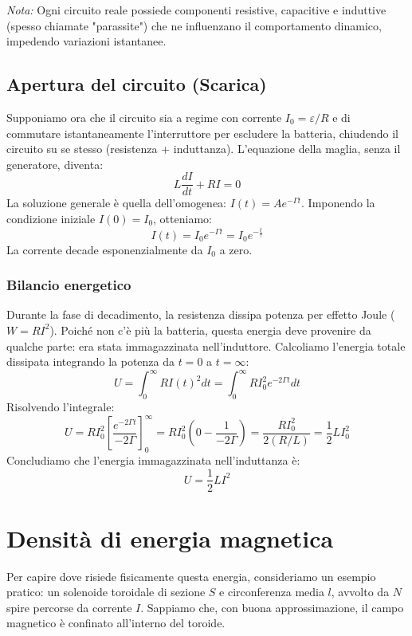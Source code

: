 \documentclass{book}
\begin{document}
\textit{Nota:} Ogni circuito reale possiede componenti resistive, capacitive e induttive (spesso chiamate "parassite") che ne influenzano il comportamento dinamico, impedendo variazioni istantanee.

\subsection{Apertura del circuito (Scarica)}
Supponiamo ora che il circuito sia a regime con corrente $I_0 = \varepsilon/R$ e di commutare istantaneamente l'interruttore per escludere la batteria, chiudendo il circuito su se stesso (resistenza + induttanza).
L'equazione della maglia, senza il generatore, diventa:
$$
L \frac{dI}{dt} + R I = 0
$$
La soluzione generale è quella dell'omogenea: $I(t) = A e^{-\Gamma t}$.
Imponendo la condizione iniziale $I(0) = I_0$, otteniamo:
$$
I(t) = I_0 e^{-\Gamma t} = I_0 e^{-\frac{t}{\tau}}
$$
La corrente decade esponenzialmente da $I_0$ a zero.

\subsubsection{Bilancio energetico}
Durante la fase di decadimento, la resistenza dissipa potenza per effetto Joule ($W = RI^2$). Poiché non c'è più la batteria, questa energia deve provenire da qualche parte: era stata immagazzinata nell'induttore.
Calcoliamo l'energia totale dissipata integrando la potenza da $t=0$ a $t=\infty$:
$$
U = \int_0^{\infty} R I(t)^2 dt = \int_0^{\infty} R I_0^2 e^{-2\Gamma t} dt
$$
Risolvendo l'integrale:
$$
U = R I_0^2 \left[ \frac{e^{-2\Gamma t}}{-2\Gamma} \right]_0^{\infty} = R I_0^2 \left( 0 - \frac{1}{-2\Gamma} \right) = \frac{R I_0^2}{2 (R/L)} = \frac{1}{2} L I_0^2
$$
Concludiamo che l'energia immagazzinata nell'induttanza è:
$$
U = \frac{1}{2} L I^2
$$

\section{Densit\`a di energia magnetica}
Per capire dove risiede fisicamente questa energia, consideriamo un esempio pratico: un solenoide toroidale di sezione $S$ e circonferenza media $l$, avvolto da $N$ spire percorse da corrente $I$.
Sappiamo che, con buona approssimazione, il campo magnetico è confinato all'interno del toroide.
\end{document}
